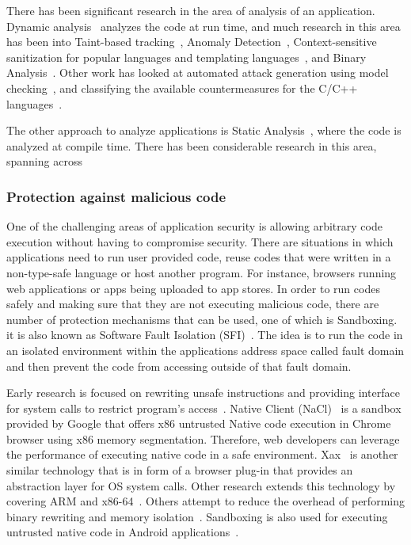 \documentclass[11pt,letterpaper]{article}
\begin{document}
There has been significant research in the area of analysis of an application. Dynamic analysis~\cite{ball1999concept} analyzes the code at run time, and much research in this area has been into Taint-based tracking~\cite{Chang2008}, Anomaly Detection~\cite{Cova2007, li11:BLOCK, Li2012}, Context-sensitive sanitization for popular languages and templating languages~\cite{Saxena2011, Samuel2011}, and Binary Analysis~\cite{Song2008}. Other work has looked at automated attack generation using model checking~\cite{martin08:goal_directed_mc}, and classifying the available countermeasures for the C/C++ languages~\cite{Younan2012}.

The other approach to analyze applications is Static Analysis~\cite{cousot1977abstract}, where the code is analyzed at compile time. There has been considerable research in this area, spanning across

\subsubsection{Protection against malicious code}
One of the challenging areas of application security is allowing arbitrary code execution without having to compromise security. There are situations in which applications need to run user provided code, reuse codes that were written in a non-type-safe language or host another program. For instance, browsers running web applications or apps being uploaded to app stores. In order to run codes safely and making sure that they are not executing malicious code, there are number of protection mechanisms that can be used, one of which is Sandboxing. it is also known as Software Fault Isolation (SFI)~\cite{Wahbe1993}. The idea is to run the code in an isolated environment within the applications address space called fault domain and then prevent the code from accessing outside of that fault domain.

Early research is focused on rewriting unsafe instructions and providing interface for system calls to restrict program's access~\cite{Wahbe1993,Mccamant2006}. Native Client (NaCl)~\cite{Yee2009a} is a sandbox provided by Google that offers x86 untrusted Native code execution in Chrome browser using x86 memory segmentation. Therefore, web developers can leverage the performance of executing native code in a safe environment. Xax~\cite{Douceur2008} is another similar technology that is in form of a browser plug-in that provides an abstraction layer for OS system calls. Other research extends this technology by covering ARM and x86-64~\cite{Zhao2011, Sehr2010,Ansel}. Others attempt to reduce the overhead of performing binary rewriting and memory isolation~\cite{Ford2008,Jana2011}. Sandboxing is also used for executing untrusted native code in Android applications~\cite{Sun2014,Afonso2016}.
\end{document}
